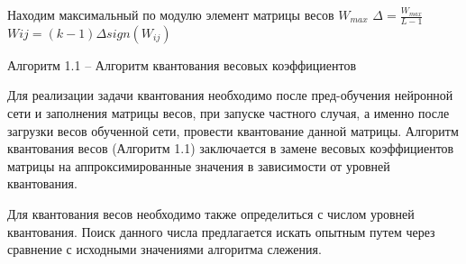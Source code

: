 	\begin{algorithm}[h!]
		\begin{algorithmic}[1]
			\State Находим максимальный по модулю элемент матрицы весов $W_{max}$
			\State $\Delta = \frac{W_{max}}{L-1}$
			\State $W{ij} = (k-1) \Delta sign(W_{ij})$
			\EndIf
			\EndFor
			\EndFor
		\end{algorithmic}
	\caption*{Алгоритм 1.1 -- Алгоритм квантования весовых коэффициентов}
	\end{algorithm}
	
Для реализации задачи квантования необходимо после пред-обучения нейронной сети и заполнения матрицы весов, при запуске частного случая, а именно после загрузки весов обученной сети, провести квантование данной матрицы. Алгоритм квантования весов (Алгоритм 1.1) заключается в замене весовых коэффициентов матрицы на аппроксимированные значения в зависимости от уровней квантования. 

Для квантования весов необходимо также определиться с числом уровней квантования. Поиск данного числа предлагается искать опытным путем через сравнение с исходными значениями алгоритма слежения. 
